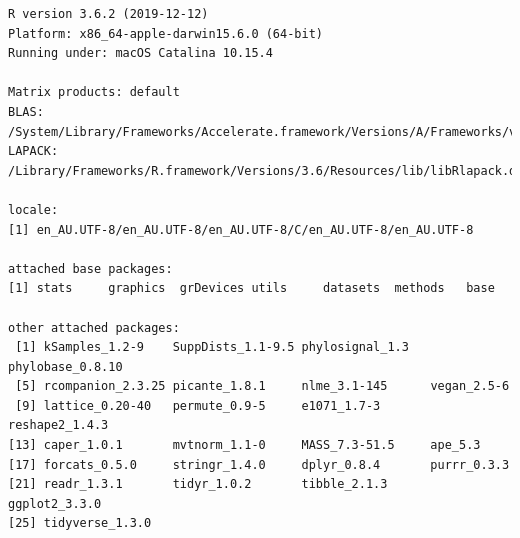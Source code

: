 \begin{verbatim}
R version 3.6.2 (2019-12-12)
Platform: x86_64-apple-darwin15.6.0 (64-bit)
Running under: macOS Catalina 10.15.4

Matrix products: default
BLAS:   /System/Library/Frameworks/Accelerate.framework/Versions/A/Frameworks/vecLib.framework/Versions/A/libBLAS.dylib
LAPACK: /Library/Frameworks/R.framework/Versions/3.6/Resources/lib/libRlapack.dylib

locale:
[1] en_AU.UTF-8/en_AU.UTF-8/en_AU.UTF-8/C/en_AU.UTF-8/en_AU.UTF-8

attached base packages:
[1] stats     graphics  grDevices utils     datasets  methods   base     

other attached packages:
 [1] kSamples_1.2-9    SuppDists_1.1-9.5 phylosignal_1.3   phylobase_0.8.10 
 [5] rcompanion_2.3.25 picante_1.8.1     nlme_3.1-145      vegan_2.5-6      
 [9] lattice_0.20-40   permute_0.9-5     e1071_1.7-3       reshape2_1.4.3   
[13] caper_1.0.1       mvtnorm_1.1-0     MASS_7.3-51.5     ape_5.3          
[17] forcats_0.5.0     stringr_1.4.0     dplyr_0.8.4       purrr_0.3.3      
[21] readr_1.3.1       tidyr_1.0.2       tibble_2.1.3      ggplot2_3.3.0    
[25] tidyverse_1.3.0  


\end{verbatim}

